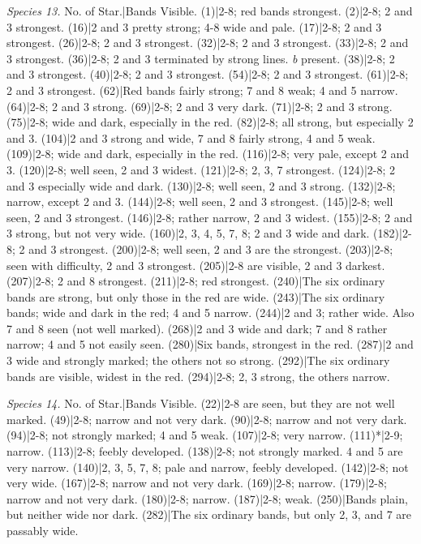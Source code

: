 \documentclass[a4paper, 12pt, oneside, polutonikogreek, english]{article}
\begin{document}
\emph{Species 13.} 
No. of Star.|Bands Visible. 
(1)|2-8; red bands strongest. 
(2)|2-8; 2 and 3 strongest. 
(16)|2 and 3 pretty strong; 4-8 wide and pale. 
(17)|2-8; 2 and 3 strongest. 
(26)|2-8; 2 and 3 strongest. 
(32)|2-8; 2 and 3 strongest. 
(33)|2-8; 2 and 3 strongest. 
(36)|2-8; 2 and 3 terminated by strong lines. \emph{b} present. 
(38)|2-8; 2 and 3 strongest. 
(40)|2-8; 2 and 3 strongest. 
(54)|2-8; 2 and 3 strongest. 
(61)|2-8; 2 and 3 strongest. 
(62)|Red bands fairly strong; 7 and 8 weak; 4 and 5 narrow. 
(64)|2-8; 2 and 3 strong. 
(69)|2-8; 2 and 3 very dark. 
(71)|2-8; 2 and 3 strong. 
(75)|2-8; wide and dark, especially in the red. 
(82)|2-8; all strong, but especially 2 and 3. 
(104)|2 and 3 strong and wide, 7 and 8 fairly strong, 4 and 5 weak. 
(109)|2-8; wide and dark, especially in the red. 
(116)|2-8; very pale, except 2 and 3. 
(120)|2-8; well seen, 2 and 3 widest. 
(121)|2-8; 2, 3, 7 strongest. 
(124)|2-8; 2 and 3 especially wide and dark. 
(130)|2-8; well seen, 2 and 3 strong. 
(132)|2-8; narrow, except 2 and 3. 
(144)|2-8; well seen, 2 and 3 strongest. 
(145)|2-8; well seen, 2 and 3 strongest. 
(146)|2-8; rather narrow, 2 and 3 widest. 
(155)|2-8; 2 and 3 strong, but not very wide. 
(160)|2, 3, 4, 5, 7, 8; 2 and 3 wide and dark. 
(182)|2-8; 2 and 3 strongest. 
(200)|2-8; well seen, 2 and 3 are the strongest. 
(203)|2-8; seen with difficulty, 2 and 3 strongest. 
(205)|2-8 are visible, 2 and 3 darkest. 
(207)|2-8; 2 and 8 strongest. 
(211)|2-8; red strongest. 
(240)|The six ordinary bands are strong, but only those in the red are wide. 
(243)|The six ordinary bands; wide and dark in the red; 4 and 5 narrow. 
(244)|2 and 3; rather wide. Also 7 and 8 seen (not well marked). 
(268)|2 and 3 wide and dark; 7 and 8 rather narrow; 4 and 5 not easily seen. 
(280)|Six bands, strongest in the red. 
(287)|2 and 3 wide and strongly marked; the others not so strong. 
(292)|The six ordinary bands are visible, widest in the red. 
(294)|2-8; 2, 3 strong, the others narrow. 

\emph{Species 14.} 
No. of Star.|Bands Visible. 
(22)|2-8 are seen, but they are not well marked. 
(49)|2-8; narrow and not very dark. 
(90)|2-8; narrow and not very dark. 
(94)|2-8; not strongly marked; 4 and 5 weak. 
(107)|2-8; very narrow. 
(111)*|2-9; narrow. 
(113)|2-8; feebly developed. 
(138)|2-8; not strongly marked. 4 and 5 are very narrow. 
(140)|2, 3, 5, 7, 8; pale and narrow, feebly developed. 
(142)|2-8; not very wide. 
(167)|2-8; narrow and not very dark. 
(169)|2-8; narrow. 
(179)|2-8; narrow and not very dark. 
(180)|2-8; narrow. 
(187)|2-8; weak. 
(250)|Bands plain, but neither wide nor dark. 
(282)|The six ordinary bands, but only 2, 3, and 7 are passably wide. 
\end{document}
